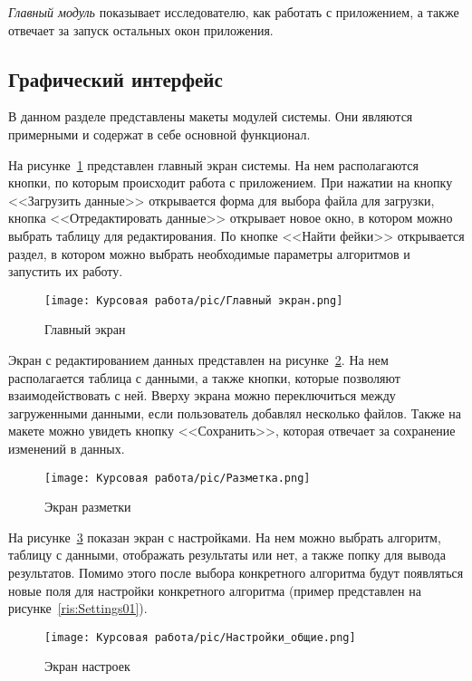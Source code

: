 \textit{Главный модуль} показывает исследователю, как работать с приложением, а также отвечает за запуск остальных окон приложения.


\vspace{1.5em}
\subsection{Графический интерфейс}
\label{subsec:Graphic}
В данном разделе представлены макеты модулей системы. Они являются примерными и содержат в себе основной функционал.

На рисунке~\ref{ris:Main} представлен главный экран системы. На нем располагаются кнопки, по которым происходит работа с приложением. При нажатии на кнопку <<Загрузить данные>> открывается форма для выбора файла для загрузки, кнопка <<Отредактировать данные>> открывает новое окно, в котором можно выбрать таблицу для редактирования. По кнопке <<Найти фейки>> открывается раздел, в котором можно выбрать необходимые параметры алгоритмов и запустить их работу.

\begin{figure}[H]
    \texttt{[image: Курсовая работа/pic/Главный экран.png]}
    \caption{Главный экран}
    \label{ris:Main}
\end{figure}

Экран с редактированием данных представлен на рисунке~\ref{ris:Razmetka}. На нем располагается таблица с данными, а также кнопки, которые позволяют взаимодействовать с ней. Вверху экрана можно переключиться между загруженными данными, если пользователь добавлял несколько файлов. Также на макете можно увидеть кнопку <<Сохранить>>, которая отвечает за сохранение изменений в данных.

\begin{figure}[H]
    \texttt{[image: Курсовая работа/pic/Разметка.png]}
    \caption{Экран разметки}
    \label{ris:Razmetka}
\end{figure}

На рисунке~\ref{ris:Settings0} показан экран с настройками. На нем можно выбрать алгоритм, таблицу с данными, отображать результаты или нет, а также попку для вывода результатов. Помимо этого после выбора конкретного алгоритма будут появляться новые поля для настройки конкретного алгоритма (пример представлен на рисунке~\ref{ris:Settings01}).

\begin{figure}[H]
    \texttt{[image: Курсовая работа/pic/Настройки\_общие.png]}
    \caption{Экран настроек}
    \label{ris:Settings0}
\end{figure}

